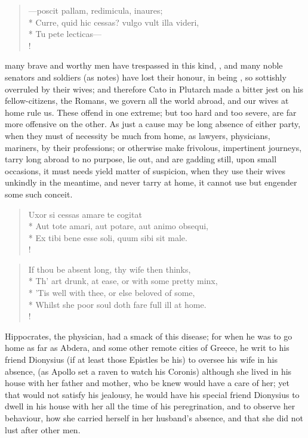 \begin{latin}%
\begin{verse}%
---poscit pallam, redimicula, inaures;\\*
Curre, quid hic cessas? vulgo vult illa videri,\\*
Tu pete lecticas---\\!
\end{verse}%
\end{latin}%
%
%
many brave and worthy men have trespassed in this kind, , and many noble senators and
soldiers (as \Pliny{} notes) have lost their honour, in being
, so sottishly overruled by their wives; and therefore Cato in
Plutarch made a bitter jest on his fellow-citizens, the Romans, we
govern all the world abroad, and our wives at home rule us. These
offend in one extreme; but too hard and too severe, are far more
offensive on the other. As just a cause may be long absence of either
party, when they must of necessity be much from home, as lawyers,
physicians, mariners, by their professions; or otherwise make
frivolous, impertinent journeys, tarry long abroad to no purpose, lie
out, and are gadding still, upon small occasions, it must needs yield
matter of suspicion, when they use their wives unkindly in the
meantime, and never tarry at home, it cannot use but engender some such
conceit.
%
\begin{latin}%
\begin{verse}%
Uxor si cessas amare te cogitat\\*
Aut tote amari, aut potare, aut animo obsequi,\\*
Ex tibi bene esse soli, quum sibi sit male.\\!
\end{verse}%
\end{latin}%
%
%
\begin{verse}%
If thou be absent long, thy wife then thinks,\\*
Th' art drunk, at ease, or with some pretty minx,\\*
'Tis well with thee, or else beloved of some,\\*
Whilst she poor soul doth fare full ill at home.\\!
\end{verse}%

Hippocrates, the physician, had a smack of this disease; for when he
was to go home as far as Abdera, and some other remote cities of
Greece, he writ to his friend Dionysius (if at least those
Epistles be his)  to oversee his wife in his absence, (as
Apollo set a raven to watch his Coronis) although she lived in his
house with her father and mother, who be knew would have a care of her;
yet that would not satisfy his jealousy, he would have his special
friend Dionysius to dwell in his house with her all the time of his
peregrination, and to observe her behaviour, how she carried herself in
her husband's absence, and that she did not lust after other men.

